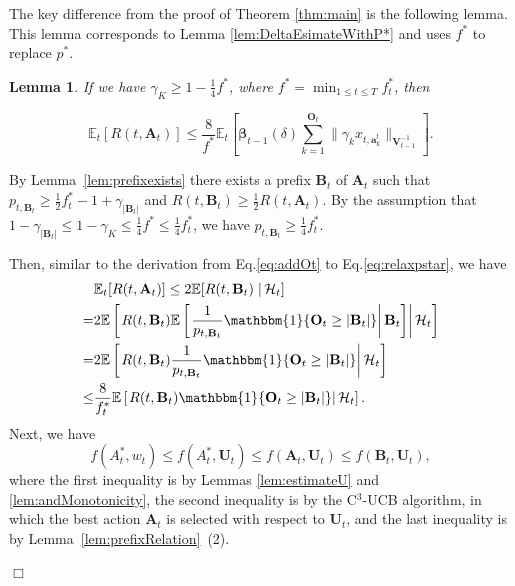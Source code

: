 \documentclass{article}
\newcommand{\bbeta}{\boldsymbol{\beta}}
\newcommand{\EE}{\mathbb{E}}
\newcommand{\bOne}{\mathbbm{1}}
\newcommand{\bA}{\mathbf{A}}
\newcommand{\ba}{\mathbf{a}}
\newcommand{\bB}{\mathbf{B}}
\newcommand{\bO}{\mathbf{O}}
\newcommand{\bU}{\mathbf{U}}
\newcommand{\bV}{\mathbf{V}}
\newcommand{\cH}{\mathcal{H}}
\newcommand{\abs}[1]{\left| #1 \right|}
\newcommand{\norm}[1]{\| #1 \|}
\newtheorem{lemma}[theorem]{Lemma}%
\newenvironment{proof}{\noindent {\textbf{Proof. }}}{$\Box$ \medskip}
\newcommand{\CEqDeltaEstAnd}{
	$$
	\EE_t [R(t, \bA_t) ] \leq \frac{8}{f^{\ast}} \EE_t \left[ \bbeta_{t-1}(\delta)\sum_{k=1}^{\bO_t}\norm{\gamma_k x_{t,\ba_k^t}}_{\bV_{t-1}^{-1}} \right].
	$$
}
\begin{document}
The key difference from the proof of Theorem \ref{thm:main} is the following lemma. This lemma corresponds to Lemma \ref{lem:DeltaEsimateWithP*} and uses $f^{\ast}$ to replace $p^{\ast}$.

\begin{lemma}
	If we have $\gamma_K \geq 1 -  \frac{1}{4} f^{\ast}$, where $f^{\ast} = \min_{1 \leq t \leq T} f_{t}^{\ast}$, then
	\CEqDeltaEstAnd
\end{lemma}
\begin{proof}
	By Lemma~\ref{lem:prefixexists} there exists a prefix $\bB_t$ of $\bA_t$ such that $p_{t, \bB_t} \geq \frac{1}{2}f_{t}^* - 1 + \gamma_{|\bB_t|}$ and $R(t, \bB_t) \geq \frac{1}{2} R(t, \bA_t)$. By the assumption that $1-\gamma_{|\bB_t|} \leq 1-\gamma_K \leq \frac{1}{4} f^{\ast} \leq \frac{1}{4} f^*_{t}  $, we have $p_{t, \bB_t} \geq \frac{1}{4}f_{t}^*$. 
	
	Then, similar to the derivation from Eq.\eqref{eq:addOt} to Eq.\eqref{eq:relaxpstar}, we have
	\begin{align}
		&\EE_t[R(t, \bA_t)] \leq 2 \EE[R(t, \bB_t) \left. \right| \cH_t] \nonumber \\
		=& 2 \EE \left[ \left. R(t, \bB_t) \EE \left[ \left. \frac{1}{p_{t, \bB_t}} \bOne\{\bO_t\geq\abs{\bB_t}\} \right| \bB_t \right]  \right| \cH_t \right] \nonumber \\
		=& 2\EE \left[ \left. R(t, \bB_t) \frac{1}{p_{t, \bB_t}} \bOne\{\bO_t\geq\abs{\bB_t}\}  \right| \cH_t \right] \nonumber \\
		\leq &\frac{8}{f_{t}^{\ast}} \EE \left[ \left. R(t, \bB_t) \bOne\{\bO_t\geq\abs{\bB_t}\}  \right| \cH_t \right]. \label{eq:btOneotbt}
	\end{align}
	Next, we have
	\begin{equation} \label{eq:andstarbt}
		f(A_t^*, w_t) \leq f(A_t^*,\bU_t) \leq f(\bA_t,\bU_t) \leq f(\bB_t,\bU_t),
	\end{equation}
	where the first inequality is by Lemmas \ref{lem:estimateU} and \ref{lem:andMonotonicity}, the second inequality is by the C$^3$-UCB algorithm, in which the best action $\bA_t$ is selected with respect to $\bU_t$, and the last inequality is by Lemma~\ref{lem:prefixRelation}~(2).
	

\end{proof}
\end{document}
